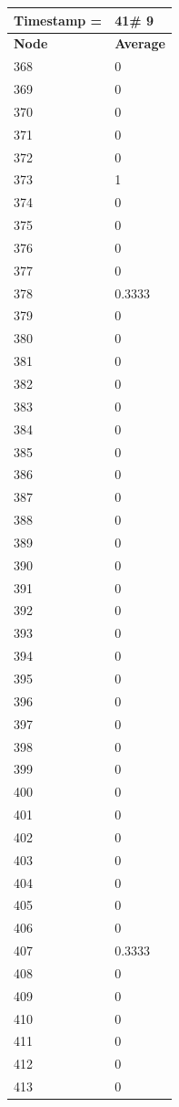 \begin{tabular}{|l||l|}
\hline
\textbf{Timestamp =} & \textbf{41}\# 9\\\hline
	\textbf{Node} & \textbf{Average} \\ \hline
\hline
	368 & 0 \\ \hline
	369 & 0 \\ \hline
	370 & 0 \\ \hline
	371 & 0 \\ \hline
	372 & 0 \\ \hline
	373 & 1 \\ \hline
	374 & 0 \\ \hline
	375 & 0 \\ \hline
	376 & 0 \\ \hline
	377 & 0 \\ \hline
	378 & 0.3333 \\ \hline
	379 & 0 \\ \hline
	380 & 0 \\ \hline
	381 & 0 \\ \hline
	382 & 0 \\ \hline
	383 & 0 \\ \hline
	384 & 0 \\ \hline
	385 & 0 \\ \hline
	386 & 0 \\ \hline
	387 & 0 \\ \hline
	388 & 0 \\ \hline
	389 & 0 \\ \hline
	390 & 0 \\ \hline
	391 & 0 \\ \hline
	392 & 0 \\ \hline
	393 & 0 \\ \hline
	394 & 0 \\ \hline
	395 & 0 \\ \hline
	396 & 0 \\ \hline
	397 & 0 \\ \hline
	398 & 0 \\ \hline
	399 & 0 \\ \hline
	400 & 0 \\ \hline
	401 & 0 \\ \hline
	402 & 0 \\ \hline
	403 & 0 \\ \hline
	404 & 0 \\ \hline
	405 & 0 \\ \hline
	406 & 0 \\ \hline
	407 & 0.3333 \\ \hline
	408 & 0 \\ \hline
	409 & 0 \\ \hline
	410 & 0 \\ \hline
	411 & 0 \\ \hline
	412 & 0 \\ \hline
	413 & 0 \\ \hline
\end{tabular}

